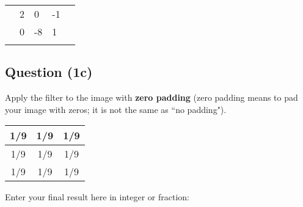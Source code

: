 \documentclass[12pt]{article}
\begin{document}
\begin{center}
\begin{tabular}{|l|l|l|l|l|}
\hline
\hspace{1mm} & \hspace{1mm} & \hspace{1mm} & \hspace{1mm} & \hspace{1mm} \\ \hline
\hspace{1mm} & \hspace{1mm}2& \hspace{1mm}0& \hspace{1mm}-1& \hspace{1mm} \\ \hline
\hspace{1mm} & \hspace{1mm}0& \hspace{1mm}-8& \hspace{1mm}1& \hspace{1mm} \\ \hline
\hspace{1mm} & \hspace{1mm} & \hspace{1mm} & \hspace{1mm} & \hspace{1mm} \\ \hline
\end{tabular}
\end{center}

\newpage

\subsection*{Question (1c)} Apply the filter to the image with \textbf{zero padding} (zero padding means to pad your image with zeros; it is not the same as ``no padding").
\begin{center}
\begin{tabular}{|c|c|c|}
\hline
1/9  & 1/9 & 1/9 \\ \hline
1/9  & 1/9 & 1/9 \\ \hline
1/9  & 1/9 & 1/9 \\ \hline
\end{tabular}
\end{center}

\noindent Enter your final result here in integer or fraction:
\end{document}
